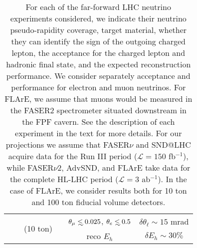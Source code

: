 \begin{table}[t]
\begin{tabularx}{\textwidth}{Xccccc}
&   &  \multirow{2}{*}{(10 ton)}   &   & $\theta_\mu \lsim 0.025$, $\theta_e \lsim 0.5$ &    $\delta \theta_\ell \sim 15 $ mrad\\
 &   &     &  & reco $E_h$  &    $\delta E_h \sim 30\% $   \\
  \bottomrule
\end{tabularx}
\vspace{0.2cm}
\caption{\small For each of the far-forward LHC neutrino experiments considered,
   we indicate their neutrino pseudo-rapidity coverage, target material, whether
  they can identify the sign of the outgoing charged lepton,
  the acceptance for the charged lepton and hadronic final state,
  and the expected reconstruction performance.
  We consider separately acceptance and performance for electron and muon
  neutrinos.
  For FLArE, we assume that muons would be measured in the FASER2 spectrometer
  situated downstream in the FPF cavern.
  See the description of each experiment in the text for more details.
  For our projections we assume that FASER$\nu$ and SND@LHC acquire data
  for the Run III period ($\mathcal{L}=150$ fb$^{-1}$), while FASER$\nu$2, AdvSND, and FLArE take data
  for the complete HL-LHC period ($\mathcal{L}=3$ ab$^{-1}$).
  In the case of FLArE, we consider results both
  for 10 ton and 100 ton fiducial volume detectors.
  \label{tab:FPF_experiments}
}
\end{table}
